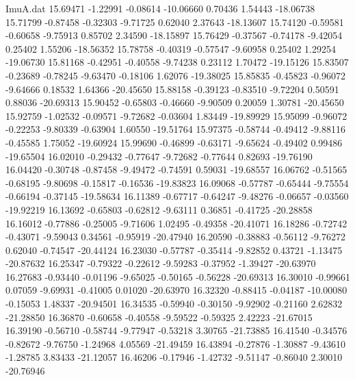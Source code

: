 \begin{filecontents}{ImuA.dat}
  15.69471   -1.22991   -0.08614  -10.06660    0.70436    1.54443  -18.06738
  15.71799   -0.87458   -0.32303   -9.71725    0.62040    2.37643  -18.13607
  15.74120   -0.59581   -0.60658   -9.75913    0.85702    2.34590  -18.15897
  15.76429   -0.37567   -0.74178   -9.42054    0.25402    1.55206  -18.56352
  15.78758   -0.40319   -0.57547   -9.60958    0.25402    1.29254  -19.06730
  15.81168   -0.42951   -0.40558   -9.74238    0.23112    1.70472  -19.15126
  15.83507   -0.23689   -0.78245   -9.63470   -0.18106    1.62076  -19.38025
  15.85835   -0.45823   -0.96072   -9.64666    0.18532    1.64366  -20.45650
  15.88158   -0.39123   -0.83510   -9.72204    0.50591    0.88036  -20.69313
  15.90452   -0.65803   -0.46660   -9.90509    0.20059    1.30781  -20.45650
  15.92759   -1.02532   -0.09571   -9.72682   -0.03604    1.83449  -19.89929
  15.95099   -0.96072   -0.22253   -9.80339   -0.63904    1.60550  -19.51764
  15.97375   -0.58744   -0.49412   -9.88116   -0.45585    1.75052  -19.60924
  15.99690   -0.46899   -0.63171   -9.65624   -0.49402    0.99486  -19.65504
  16.02010   -0.29432   -0.77647   -9.72682   -0.77644    0.82693  -19.76190
  16.04420   -0.30748   -0.87458   -9.49472   -0.74591    0.59031  -19.68557
  16.06762   -0.51565   -0.68195   -9.80698   -0.15817   -0.16536  -19.83823
  16.09068   -0.57787   -0.65444   -9.75554   -0.66194   -0.37145  -19.58634
  16.11389   -0.67717   -0.64247   -9.48276   -0.06657   -0.03560  -19.92219
  16.13692   -0.65803   -0.62812   -9.63111    0.36851   -0.41725  -20.28858
  16.16012   -0.77886   -0.25005   -9.71606    1.02495   -0.49358  -20.41071
  16.18286   -0.72742   -0.43071   -9.59043    0.34561   -0.95919  -20.47940
  16.20590   -0.38883   -0.56112   -9.76272    0.62040   -0.74547  -20.44124
  16.23030   -0.57787   -0.35414   -9.82852    0.43721   -1.13475  -20.87632
  16.25347   -0.79322   -0.22612   -9.59283   -0.37952   -1.39427  -20.63970
  16.27683   -0.93440   -0.01196   -9.65025   -0.50165   -0.56228  -20.69313
  16.30010   -0.99661    0.07059   -9.69931   -0.41005    0.01020  -20.63970
  16.32320   -0.88415   -0.04187  -10.00080   -0.15053    1.48337  -20.94501
  16.34535   -0.59940   -0.30150   -9.92902   -0.21160    2.62832  -21.28850
  16.36870   -0.60658   -0.40558   -9.59522   -0.59325    2.42223  -21.67015
  16.39190   -0.56710   -0.58744   -9.77947   -0.53218    3.30765  -21.73885
  16.41540   -0.34576   -0.82672   -9.76750   -1.24968    4.05569  -21.49459
  16.43894   -0.27876   -1.30887   -9.43610   -1.28785    3.83433  -21.12057
  16.46206   -0.17946   -1.42732   -9.51147   -0.86040    2.30010  -20.76946

\end{filecontents}
